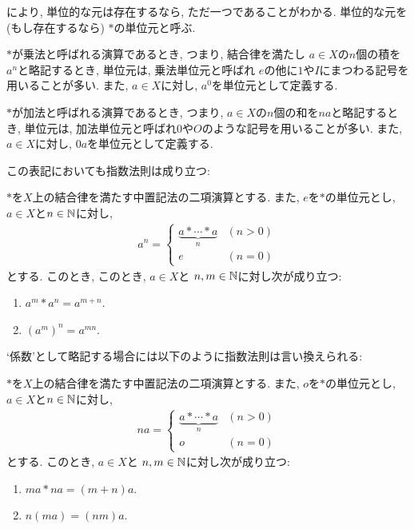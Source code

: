 \begin{remark}
  \label{rem:uniq:unit}
  により,
  単位的な元は存在するなら, ただ一つであることがわかる.
  単位的な元を (もし存在するなら)
  $\ast$の単位元と呼ぶ.

  $\ast$が乗法と呼ばれる演算であるとき,
  つまり, 結合律を満たし
  $a\in X$の$n$個の積を$a^n$と略記するとき,
  単位元は,
  乗法単位元と呼ばれ
  $e$の他に$1$や$I$にまつわる記号を用いることが多い.
  また, $a\in X$に対し, $a^0$を単位元として定義する.

  $\ast$が加法と呼ばれる演算であるとき,
  つまり, $a\in X$の$n$個の和を$na$と略記するとき,
  単位元は, 加法単位元と呼ばれ$0$や$O$のような記号を用いることが多い.
  また, $a\in X$に対し, $0a$を単位元として定義する.
\end{remark}
この表記においても指数法則は成り立つ:
\begin{prop}
  $\ast$を$X$上の結合律を満たす中置記法の二項演算とする.
  また, $e$を$\ast$の単位元とし,
  $a\in X$と$n\in\mathbb{N}$に対し,
  \begin{align*}
    a^n=
    \begin{cases}
      \underbrace{a\ast \cdots \ast a}_{n} & (n>0)\\
      e & (n=0)
    \end{cases}
  \end{align*}
  とする.
  このとき,
    このとき,
  $a\in X$と
  $n,m\in\mathbb{N}$に対し次が成り立つ:
  \begin{enumerate}
    \item $a^m\ast a^n=a^{m+n}$.
    \item $(a^m)^n=a^{mn}$.
  \end{enumerate}
\end{prop}
`係数'として略記する場合には以下のように指数法則は言い換えられる:
\begin{prop}
  $\ast$を$X$上の結合律を満たす中置記法の二項演算とする.
  また, $o$を$\ast$の単位元とし,
  $a\in X$と$n\in\mathbb{N}$に対し,
  \begin{align*}
    na=
    \begin{cases}
      \underbrace{a\ast \cdots \ast a}_{n} & (n>0)\\
      o & (n=0)
    \end{cases}
  \end{align*}
  とする.
  このとき,
  $a\in X$と
  $n,m\in\mathbb{N}$に対し次が成り立つ:
  \begin{enumerate}
    \item $ma\ast na=(m+n)a$.
    \item $n(ma)=(nm)a$.
  \end{enumerate}
\end{prop}

